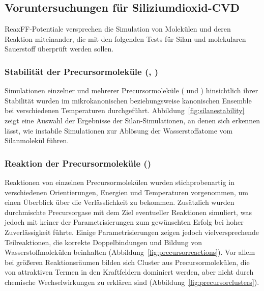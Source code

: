\subsection{Voruntersuchungen für Siliziumdioxid-CVD}

ReaxFF-Potentiale versprechen die Simulation von Molekülen und deren Reaktion miteinander, die mit den folgenden Tests für Silan und molekularen Sauerstoff überprüft werden sollen.

\subsubsection{Stabilität der Precursormoleküle (, )}

Simulationen einzelner und mehrerer Precursormoleküle ( und ) hinsichtlich ihrer Stabilität wurden im mikrokanonischen beziehungsweise kanonischen Ensemble bei verschiedenen Temperaturen durchgeführt.
Abbildung~\ref{fig:silanestability} zeigt eine Auswahl der Ergebnisse der Silan-Simulationen, an denen sich erkennen lässt, wie instabile Simulationen zur Ablösung der Wasserstoffatome vom Silanmolekül führen.

\subsubsection{Reaktion der Precursormoleküle ()}

Reaktionen von einzelnen Precursormolekülen wurden stichprobenartig in verschiedenen Orientierungen, Energien und Temperaturen vorgenommen, um einen Überblick über die Verlässlichkeit zu bekommen.
Zusätzlich wurden durchmischte Precursorgase mit dem Ziel eventueller Reaktionen simuliert, was jedoch mit keiner der Parametrisierungen zum gewünschten Erfolg bei hoher Zuverlässigkeit führte.
Einige Parametrisierungen zeigen jedoch vielversprechende Teilreaktionen, die korrekte Doppelbindungen und Bildung von Wasserstoffmolekülen beinhalten (Abbildung~\ref{fig:precursorreactions}).
Vor allem bei größeren Reaktionsräumen bilden sich Cluster aus Precursormolekülen, die von attraktiven Termen in den Kraftfeldern dominiert werden, aber nicht durch chemische Wechselwirkungen zu erklären sind (Abbildung~\ref{fig:precursorclusters}).

